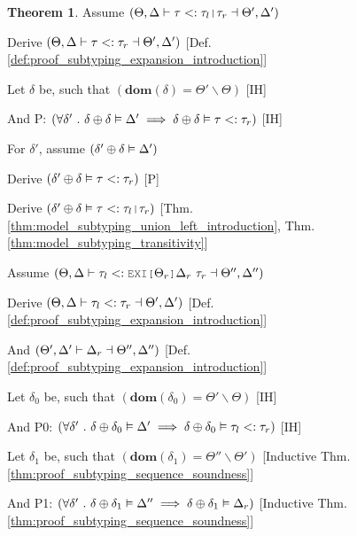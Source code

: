 \documentclass[acmsmall]{acmart}
\theoremstyle{definition}
\newtheorem{theorem}{Theorem}[section]
\begin{document}
\begin{theorem}

  \item \N Assume $(
    \Theta, \Delta \entails \tau \subtypes \tau_{l}\J{|}\tau_{r} \given \Theta', \Delta' 
  )$
  \item \I \N Derive $(
    \Theta, \Delta \vdash \tau <: \tau_{r} \dashv \Theta', \Delta' 
  )$ [Def. \ref{def:proof_subtyping_expansion_introduction}]

  \item \I \N Let $\delta$ be, such that $(
    \textbf{dom}(\delta) = \Theta' \backslash \Theta
  )$ [IH]
  \item \I \N And P: $(
    \forall \delta' \ .\  
    \delta \oplus \delta \vDash \Delta' 
    \implies 
    \delta \oplus \delta \vDash \tau <: \tau_{r}
  )$ [IH]
  \item \I \N For $\delta'$, assume $(\delta' \oplus \delta \vDash \Delta')$
  \item \I\I \N Derive $(\delta' \oplus \delta \vDash \tau <: \tau_{r})$ [P]
  \item \I\I \N Derive $(
    \delta' \oplus \delta \satisfies \tau \subtypes \tau_l \J{|} \tau_r
  )$ [Thm. \ref{thm:model_subtyping_union_left_introduction}, Thm. \ref{thm:model_subtyping_transitivity}]


  \item \N Assume $(
    \Theta, \Delta \entails 
    \tau_l
    \subtypes 
    \J{EXI[}\Theta_r\J{]}\Delta_r\ \tau_r \given \Theta'', \Delta'' 
  )$
  \item \I \N Derive $(
    \Theta, \Delta \vdash \tau_l <: \tau_r \dashv \Theta', \Delta'
  )$ [Def. \ref{def:proof_subtyping_expansion_introduction}]
  \item \I \N And $(
    \Theta', \Delta' \vdash \Delta_r \dashv \Theta'', \Delta'' 
  )$ [Def. \ref{def:proof_subtyping_expansion_introduction}]

  \item \I \N Let $\delta_0$ be, such that $(
    \textbf{dom}(\delta_0) = \Theta' \backslash \Theta
  )$ [IH]
  \item \I \N And P0: $(
    \forall \delta' \ .\  
    \delta \oplus \delta_0 \vDash \Delta' 
    \implies 
    \delta \oplus \delta_0 \vDash \tau_l <: \tau_r
  )$ [IH]

  \item \I \N Let $\delta_1$ be, such that $(
    \textbf{dom}(\delta_1) = \Theta'' \backslash \Theta'
  )$ [Inductive Thm. \ref{thm:proof_subtyping_sequence_soundness}]
  \item \I \N And P1: $(
    \forall \delta' \ .\  
    \delta \oplus \delta_1 \vDash \Delta'' 
    \implies 
    \delta \oplus \delta_1 \vDash \Delta_r 
  )$ [Inductive Thm. \ref{thm:proof_subtyping_sequence_soundness}]



\end{theorem}
\end{document}
